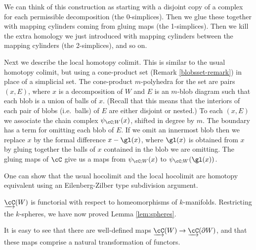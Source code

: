 We can think of this construction as starting with a disjoint copy of a complex for each
permissible decomposition (the 0-simplices).
Then we glue these together with mapping cylinders coming from gluing maps
(the 1-simplices).
Then we kill the extra homology we just introduced with mapping 
cylinders between the mapping cylinders (the 2-simplices), and so on.

Next we describe the local homotopy colimit.
This is similar to the usual homotopy colimit, but using
a cone-product set (Remark \ref{blobsset-remark}) in place of a simplicial set.
The cone-product $m$-polyhedra for the set are pairs $(x, E)$, where $x$ is a decomposition of $W$
and $E$ is an $m$-blob diagram such that each blob is a union of balls of $x$.
(Recall that this means that the interiors of
each pair of blobs (i.e.\ balls) of $E$ are either disjoint or nested.)
To each $(x, E)$ we associate the chain complex $\psi_{\cC;W}(x)$, shifted in degree by $m$.
The boundary has a term for omitting each blob of $E$.
If we omit an innermost blob then we replace $x$ by the formal difference $x - \gl(x)$, where
$\gl(x)$ is obtained from $x$ by gluing together the balls of $x$ contained in the blob we are omitting.
The gluing maps of $\cC$ give us a maps from $\psi_{\cC;W}(x)$ to $\psi_{\cC;W}(\gl(x))$.

One can show that the usual hocolimit and the local hocolimit are homotopy equivalent using an 
Eilenberg-Zilber type subdivision argument.

\medskip

$\cl{\cC}(W)$ is functorial with respect to homeomorphisms of $k$-manifolds. 
Restricting the $k$-spheres, we have now proved Lemma \ref{lem:spheres}.

It is easy to see that
there are well-defined maps $\cl{\cC}(W)\to\cl{\cC}(\bd W)$, and that these maps
comprise a natural transformation of functors.



